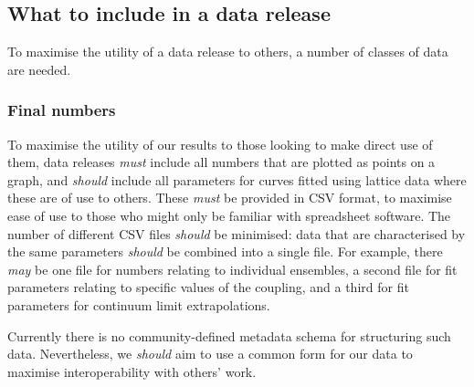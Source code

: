 \documentclass{article}
\newcommand\rfcword[1]{\emph{#1}\xspace}
\newcommand\must{\rfcword{must}}
\newcommand\should{\rfcword{should}}
\newcommand\may{\rfcword{may}}
\begin{document}
\subsection{What to include in a data release}

To maximise the utility of a data release to others,
a number of classes of data are needed.

\subsubsection{Final numbers}\label{sec:dr-numbers}

To maximise the utility of our results to those looking to make direct use of them,
data releases \must include all numbers that are plotted as points on a graph,
and \should include all parameters for curves fitted using lattice data
where these are of use to others.
These \must be provided in CSV format,
to maximise ease of use to those who might only be familiar with spreadsheet software.
The number of different CSV files \should be minimised:
data that are characterised by the same parameters
\should be combined into a single file.
For example,
there \may be one file for numbers relating to individual ensembles,
a second file for fit parameters relating to specific values of the coupling,
and a third for fit parameters for continuum limit extrapolations.

Currently there is no community-defined metadata schema for structuring such data.
Nevertheless,
we \should aim to use a common form for our data
to maximise interoperability with others' work.
\end{document}
